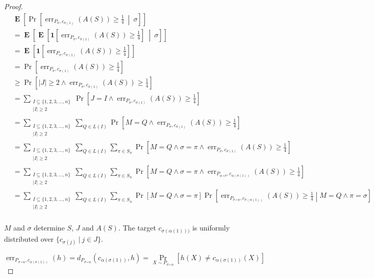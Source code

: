 \documentclass[12pt]{article}
\newcommand{\indicator}[1]{\mathbf{1}\left[{#1}\right]}
\DeclareMathOperator{\err}{err}
\DeclareMathOperator{\Exp}{\mathbf{E}}
\begin{document}
\begin{proof}
\begin{align*}
& \Exp \left[ \Pr \left[\err_{P_\sigma,c_{\sigma(1)}}(A(S)) \ge \frac{1}{4} \ \middle| \ \sigma \right] \right] \\
& = \Exp \left[ \Exp \left[ \indicator{ \err_{P_\sigma,c_{\sigma(1)}}(A(S)) \ge \frac{1}{4}} \ \middle| \ \sigma \right] \right] \\
& = \Exp \left[ \indicator{ \err_{P_\sigma,c_{\sigma(1)}}(A(S)) \ge \frac{1}{4}} \right] \\
& = \Pr \left[ \err_{P_\sigma,c_{\sigma(1)}}(A(S)) \ge \frac{1}{4} \right] \\
& \ge \Pr \left[ |J| \ge 2 \wedge \err_{P_\sigma,c_{\sigma(1)}}(A(S)) \ge \frac{1}{4} \right] \\
& = \sum_{\substack{I \subseteq \{1,2,3,\dots,n\} \\ |I| \ge 2}} \Pr \left[ J = I \wedge \err_{P_\sigma,c_{\sigma(1)}}(A(S)) \ge \frac{1}{4} \right] \\
& = \sum_{\substack{I \subseteq \{1,2,3,\dots,n\} \\ |I| \ge 2}} \sum_{Q \in L(I)} \Pr \left[ M = Q \wedge \err_{P_\sigma,c_{\sigma(1)}}(A(S)) \ge \frac{1}{4} \right] \\
& = \sum_{\substack{I \subseteq \{1,2,3,\dots,n\} \\ |I| \ge 2}} \sum_{Q \in L(I)} \sum_{\pi \in S_n} \Pr \left[ M = Q \wedge \sigma = \pi \wedge \err_{P_\sigma,c_{\sigma(1)}}(A(S)) \ge \frac{1}{4} \right] \\
& = \sum_{\substack{I \subseteq \{1,2,3,\dots,n\} \\ |I| \ge 2}} \sum_{Q \in L(I)} \sum_{\pi \in S_n} \Pr \left[ M = Q \wedge \sigma = \pi \wedge \err_{P_{\alpha \circ \sigma},c_{\alpha(\sigma(1))}}(A(S)) \ge \frac{1}{4} \right] \\
& = \sum_{\substack{I \subseteq \{1,2,3,\dots,n\} \\ |I| \ge 2}} \sum_{Q \in L(I)} \sum_{\pi \in S_n} \Pr \left[ M = Q \wedge \sigma = \pi \right] \Pr \left[ \err_{P_{\sigma \circ \alpha},c_{\sigma(\alpha(1))}}(A(S)) \ge \frac{1}{4} \middle | M = Q \wedge \pi = \sigma \right] \\
\end{align*}

$M$ and $\sigma$ determine $S$, $J$ and $A(S)$. The target
$c_{\sigma(\alpha(1)))}$ is uniformly distributed over $\{ c_{\sigma(j)} ~|~ j \in J\}$.

$$
\err_{P_{\sigma \circ \alpha},c_{\alpha(\sigma(1))}}(h)
= d_{P_{\sigma \circ \alpha}} (c_{\alpha(\sigma(1))}, h)
= \Pr_{X \sim P_{\sigma \circ \alpha}} \left[ h(X) \neq  c_{\alpha(\sigma(1))}(X) \right]
$$


\end{proof}
\end{document}
